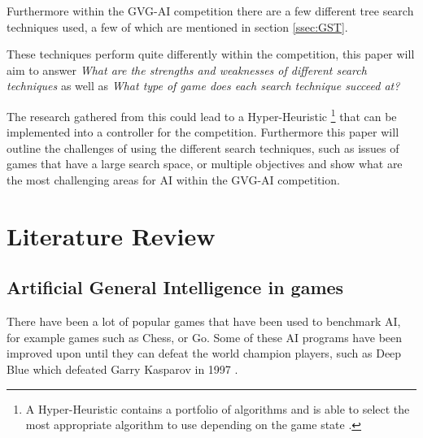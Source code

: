 \documentclass[journal]{IEEEtran}
\begin{document}
	Furthermore within the GVG-AI competition there are a few different tree search techniques used, a few of which are mentioned in section \ref{ssec:GST}. 
	
	These techniques perform quite differently within the competition, this paper will aim to answer \textit{What are the strengths and weaknesses of different search techniques} as well as \textit{What type of game does each search technique succeed at?}


	
	The research gathered from this could lead to a Hyper-Heuristic \footnote{A Hyper-Heuristic contains a portfolio of algorithms and is able to select the most appropriate algorithm to use depending on the game state \cite{hyperHeurisicMendes, horn2016mcts}.}  that can be implemented into a controller for the competition. 
	Furthermore this paper will outline the challenges of using the different search techniques, such as issues of games that have a large search space, or multiple objectives and show what are the most challenging areas for AI within the GVG-AI competition.
	





\section{Literature Review}
	\subsection{Artificial General Intelligence in games}
		
		There have been a lot of popular games that have been used to benchmark AI, for example games such as Chess, or Go. Some of these AI programs have been improved upon until they can defeat the world champion players, such as Deep Blue which defeated Garry Kasparov in 1997 \cite{DeepBlue, shannon1988programming, DeepBlueOverview}. 
\end{document}
